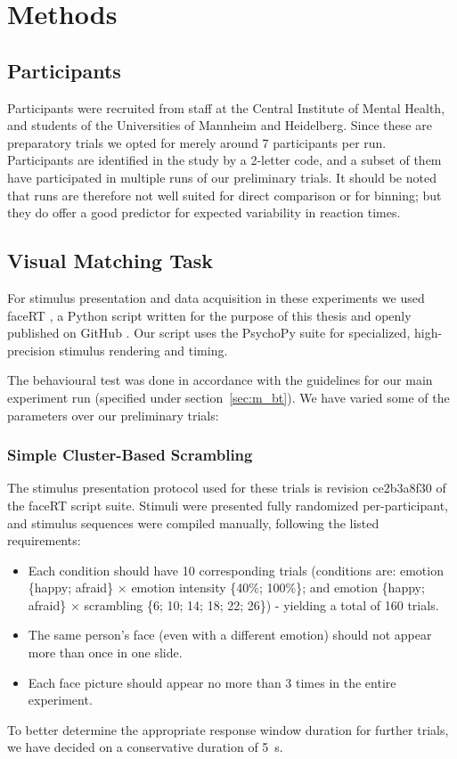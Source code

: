     \section{Methods}
	\subsection{Participants}
	    Participants were recruited from staff at the Central Institute of Mental Health, and students of the Universities of Mannheim and Heidelberg.
	    Since these are preparatory trials we opted for merely around 7 participants per run.
	    Participants are identified in the study by a 2-letter code, and a subset of them have participated in multiple runs of our preliminary trials.
	    It should be noted that runs are therefore not well suited for direct comparison or for binning; but they do offer a good predictor for expected variability in reaction times.
	\subsection{Visual Matching Task}
	    For stimulus presentation and data acquisition in these experiments we used faceRT \citep{faceRT}, a Python script written for the purpose of this thesis and openly published on GitHub \citep{github}.
	    Our script uses the PsychoPy suite \citep{Peirce2008} for specialized, high-precision stimulus rendering and timing.
	    
	    The behavioural test was done in accordance with the guidelines for our main experiment run (specified under section~\ref{sec:m_bt}).
	    We have varied some of the parameters over our preliminary trials:
	    \subsubsection{Simple Cluster-Based Scrambling}\label{sec:pe_m_bt_ss}
		The stimulus presentation protocol used for these trials is revision \textcolor{lg}{ce2b3a8f30} of the faceRT \citep{faceRT} script suite.
		Stimuli were presented fully randomized per-participant, and stimulus sequences were compiled manually, following the listed requirements:
		\begin{itemize}
		    \item Each condition should have 10 corresponding trials (conditions are: emotion \{happy; afraid\} $\times$ emotion intensity \{40\%; 100\%\}; and emotion \{happy; afraid\} $\times$ scrambling \{6; 10; 14; 18; 22; 26\}) - yielding a total of 160 trials.
		    \item The same person's face (even with a different emotion) should not appear more than once in one slide.
		    \item Each face picture should appear no more than 3 times in the entire experiment.
		\end{itemize}
		To better determine the appropriate response window duration for further trials, we have decided on a conservative duration of \SI{5}{\second}.
